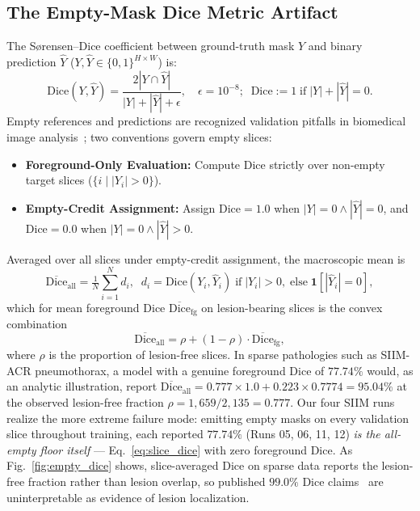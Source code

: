 \documentclass[runningheads]{llncs}
\begin{document}
\subsection{The Empty-Mask Dice Metric Artifact}
The S{\o}rensen--Dice coefficient between ground-truth mask $Y$ and binary prediction $\hat{Y}$ ($Y, \hat{Y} \in \{0, 1\}^{H \times W}$) is:
\begin{equation}
    \text{Dice}(Y, \hat{Y}) = \frac{2 |Y \cap \hat{Y}|}{|Y| + |\hat{Y}| + \epsilon}, \quad \epsilon = 10^{-8}; \;\; \text{Dice} := 1 \;\text{if}\; |Y| + |\hat{Y}| = 0.
\end{equation}
Empty references and predictions are recognized validation pitfalls in biomedical image analysis~\cite{reinke2024metrics}; two conventions govern empty slices:
\begin{itemize}
    \item \textbf{Foreground-Only Evaluation:} Compute Dice strictly over non-empty target slices ($\{i \mid |Y_i| > 0\}$).
    \item \textbf{Empty-Credit Assignment:} Assign $\text{Dice} = 1.0$ when $|Y| = 0 \land |\hat{Y}| = 0$, and $\text{Dice} = 0.0$ when $|Y| = 0 \land |\hat{Y}| > 0$.
\end{itemize}
Averaged over all slices under empty-credit assignment, the macroscopic mean is
\begin{equation}\label{eq:slice_dice}
    \overline{\text{Dice}}_{\text{all}} = \tfrac{1}{N}\textstyle\sum_{i=1}^{N} d_i, \;\; d_i = \text{Dice}(Y_i, \hat{Y}_i) \;\text{if}\; |Y_i| > 0, \;\text{else}\; \mathbf{1}\!\left[|\hat{Y}_i| = 0\right],
\end{equation}
which for mean foreground Dice $\overline{\text{Dice}}_{\text{fg}}$ on lesion-bearing slices is the convex combination
\begin{equation}\label{eq:convex_dice}
    \overline{\text{Dice}}_{\text{all}} = \rho + (1 - \rho) \cdot \overline{\text{Dice}}_{\text{fg}},
\end{equation}
where $\rho$ is the proportion of lesion-free slices. In sparse pathologies such as SIIM-ACR pneumothorax, a model with a genuine foreground Dice of $77.74\%$ would, as an analytic illustration, report $\overline{\text{Dice}}_{\text{all}} = 0.777 \times 1.0 + 0.223 \times 0.7774 = 95.04\%$ at the observed lesion-free fraction $\hat{\rho} = 1{,}659/2{,}135 = 0.777$. Our four SIIM runs realize the more extreme failure mode: emitting empty masks on every validation slice throughout training, each reported $77.74\%$ (Runs 05, 06, 11, 12) \emph{is the all-empty floor itself} --- Eq.~\ref{eq:slice_dice} with zero foreground Dice. As Fig.~\ref{fig:empty_dice} shows, slice-averaged Dice on sparse data reports the lesion-free fraction rather than lesion overlap, so published $99.0\%$ Dice claims~\cite{rhanoui2025multitask} are uninterpretable as evidence of lesion localization.
\end{document}
